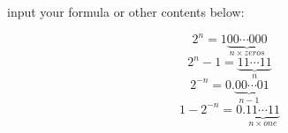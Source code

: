 \documentclass{article}
\begin{document}
input your formula or other contents below:



\[2^{n}=1\underbrace{00\cdots 000}_{n\times zeros}\]
\[2^{n}-1=\underbrace{11\cdots 11}_{n}\]
\[2^{-n}=0.\underbrace{00\cdots 0}_{n-1}1\]
\[1-2^{-n}=0.\underbrace{11\cdots11}_{n\times one}\]
\end{document}
